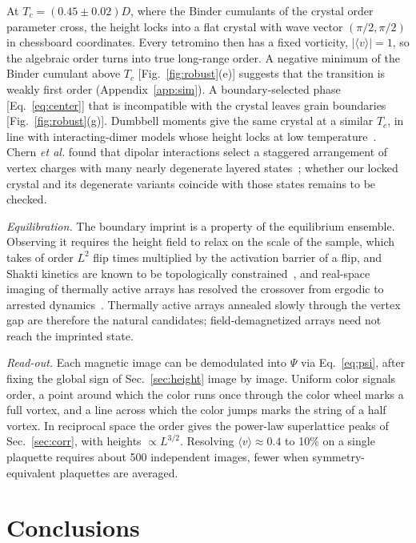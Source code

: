 \documentclass[aps,prb,twocolumn,floatfix,longbibliography]{revtex4-2}
\begin{document}
At $T_c=(0.45\pm0.02)D$, where the Binder cumulants of the crystal order parameter cross, the height locks into a flat crystal with wave vector $(\pi/2,\pi/2)$ in chessboard coordinates. Every tetromino then has a fixed vorticity, $|\langle v\rangle|=1$, so the algebraic order turns into true long-range order. A negative minimum of the Binder cumulant above $T_c$ [Fig.~\ref{fig:robust}(e)] suggests that the transition is weakly first order (Appendix~\ref{app:sim}). A boundary-selected phase [Eq.~\eqref{eq:center}] that is incompatible with the crystal leaves grain boundaries [Fig.~\ref{fig:robust}(g)]. Dumbbell moments give the same crystal at a similar $T_c$, in line with interacting-dimer models whose height locks at low temperature~\cite{Alet2005}. Chern \emph{et al.} found that dipolar interactions select a staggered arrangement of vertex charges with many nearly degenerate layered states~\cite{Chern2013}; whether our locked crystal and its degenerate variants coincide with those states remains to be checked.

\emph{Equilibration.} The boundary imprint is a property of the equilibrium ensemble. Observing it requires the height field to relax on the scale of the sample, which takes of order $L^2$ flip times multiplied by the activation barrier of a flip, and Shakti kinetics are known to be topologically constrained~\cite{Lao2018,Priyanka2025}, and real-space imaging of thermally active arrays has resolved the crossover from ergodic to arrested dynamics~\cite{Saccone2023}. Thermally active arrays annealed slowly through the vertex gap are therefore the natural candidates; field-demagnetized arrays need not reach the imprinted state.

\emph{Read-out.} Each magnetic image can be demodulated into $\Psi$ via Eq.~\eqref{eq:psi}, after fixing the global sign of Sec.~\ref{sec:height} image by image. Uniform color signals order, a point around which the color runs once through the color wheel marks a full vortex, and a line across which the color jumps marks the string of a half vortex. In reciprocal space the order gives the power-law superlattice peaks of Sec.~\ref{sec:corr}, with heights $\propto L^{3/2}$. Resolving $\langle v\rangle\approx0.4$ to 10\% on a single plaquette requires about 500 independent images, fewer when symmetry-equivalent plaquettes are averaged.


\section{Conclusions}
\label{sec:conclusion}
\end{document}
